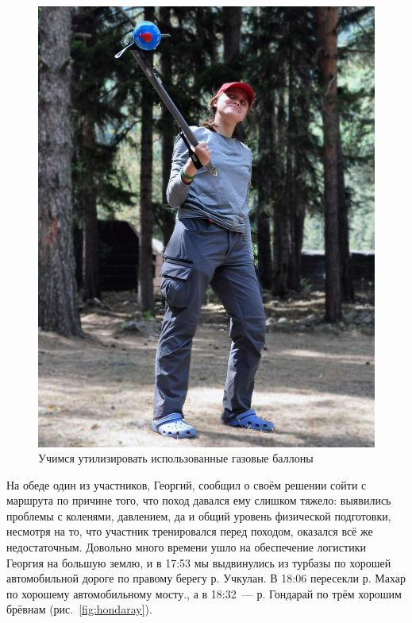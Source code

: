 \begin{figure}[h!]
\begin{minipage}[h]{0.30\linewidth}
		\includegraphics[width=\linewidth]{../pics/DSC_1152.jpg}
	\end{minipage}
	\caption{Учимся утилизировать использованные газовые баллоны \smiley}
	\label{fig:DSC_1150}
\end{figure}

На обеде один из участников, Георгий, сообщил о своём решении сойти с маршрута по причине того, что поход давался ему слишком тяжело: выявились проблемы с коленями, давлением, да и общий уровень физической подготовки, несмотря на то, что участник тренировался перед походом, оказался всё же недостаточным. Довольно много времени ушло на обеспечение логистики Георгия на большую землю, и в 17:53 мы выдвинулись из турбазы по хорошей автомобильной дороге по правому берегу р. Учкулан. В 18:06 пересекли р. Махар по хорошему автомобильному мосту., а в 18:32~--- р. Гондарай по трём хорошим брёвнам (рис.~\ref{fig:hondaray}).

